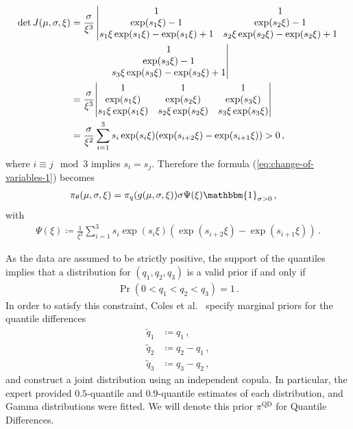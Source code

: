 \documentclass{article}
\DeclarePairedDelimiter\abs{\lvert}{\rvert}
\begin{document}
\begin{align*}
	\det J(\mu, \sigma, \xi)
		&= \frac{\sigma}{\xi ^ {3}} \left\vert
		\begin{matrix}
			1 &1\\
			\exp(s_1 \xi)-1 &\exp(s_2 \xi)-1\\
			s_1 \xi \exp(s_1 \xi) - \exp(s_1 \xi) + 1
				&s_2 \xi \exp(s_2 \xi) - \exp(s_2 \xi) + 1
		\end{matrix}
	\right.\\
	&\qquad \qquad \left.
		\begin{matrix}
			1\\
			\exp(s_3 \xi) - 1\\
			s_3 \xi \exp(s_3 \xi) -\exp(s_3 \xi) + 1
		\end{matrix}
	\right\vert\\
	&= \frac{\sigma}{\xi ^ {3}} \abs*{
		\begin{matrix}
			1 &1 &1\\
			\exp(s_1 \xi) &\exp(s_2 \xi) &\exp(s_3 \xi)\\
			s_1 \xi \exp(s_1 \xi)
				&s_2 \xi \exp(s_2 \xi)
				&s_3 \xi \exp(s_3 \xi)
		\end{matrix}
	}\\
	&= \frac{\sigma}{\xi ^ {2}}
		\sum_{i=1}^3 s_i \exp(s_i \xi)
		(\exp(s_{i + 2} \xi) - \exp(s_{i + 1} \xi)) > 0 \,,
\end{align*}
%
where $i \equiv j \mod 3$ implies $s_i=s_j$.
Therefore the formula (\ref{eq:change-of-variables-1}) becomes
%
\begin{align}
	\pi_\theta(\mu, \sigma, \xi)
		&= \pi_q(g(\mu, \sigma, \xi)) \sigma \Psi(\xi)
		\mathbbm{1}_{\sigma>0} \,,
	\label{eq:change-of-variables-2}
\end{align}
%
with
%
\begin{align*}
	\Psi(\xi) \coloneqq \frac{1}{\xi^ {2}}
		\sum_{i=1}^3 s_i \exp(s_i \xi)
		(\exp(s_{i + 2} \xi) - \exp(s_{i + 1} \xi)) \,.
\end{align*}
%

%
As the data are assumed to be strictly positive,
the support of the quantiles implies
that a distribution for $(q_1, q_2, q_3)$ is a valid prior if and only if
%
\begin{align*}
	\Pr(0 < q_1 < q_2 < q_3) = 1\,.
\end{align*}
%
In order to satisfy this constraint,
Coles et al.~\cite{coles1996} specify marginal priors for the quantile differences
%
\begin{align*}
	\tilde{q}_1 &\coloneqq q_1 \,,\\
	\tilde{q}_2 &\coloneqq q_2 - q_1 \,,\\
	\tilde{q}_3 &\coloneqq q_3 - q_2 \,,
\end{align*}
%
and construct a joint distribution using an independent copula.
In particular, the expert provided $0.5$-quantile and $0.9$-quantile estimates
of each distribution, and Gamma distributions were fitted.
We will denote this prior $\pi^{\text{QD}}$ for Quantile Differences.
%
\end{document}
